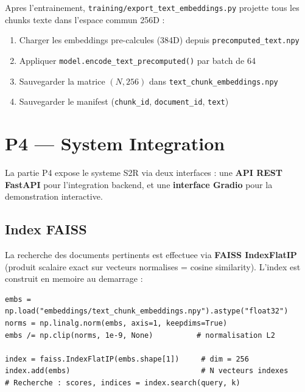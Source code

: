 \documentclass[12pt, a4paper]{article}
\begin{document}
Apres l'entrainement, \texttt{training/export\_text\_embeddings.py} projette
tous les chunks texte dans l'espace commun 256D :

\begin{enumerate}[leftmargin=1.5cm]
  \item Charger les embeddings pre-calcules (384D) depuis \texttt{precomputed\_text.npy}
  \item Appliquer \texttt{model.encode\_text\_precomputed()} par batch de 64
  \item Sauvegarder la matrice $(N, 256)$ dans \texttt{text\_chunk\_embeddings.npy}
  \item Sauvegarder le manifest (\texttt{chunk\_id}, \texttt{document\_id}, \texttt{text})
\end{enumerate}

\newpage

\section{P4 --- System Integration}

La partie P4 expose le systeme S2R via deux interfaces :
une \textbf{API REST FastAPI} pour l'integration backend,
et une \textbf{interface Gradio} pour la demonstration interactive.

\subsection{Index FAISS}

La recherche des documents pertinents est effectuee via
\textbf{FAISS IndexFlatIP} (produit scalaire exact sur vecteurs normalises = cosine similarity).
L'index est construit en memoire au demarrage :

\begin{lstlisting}[caption={Construction de l'index FAISS (api/main.py)}]
embs = np.load("embeddings/text_chunk_embeddings.npy").astype("float32")
norms = np.linalg.norm(embs, axis=1, keepdims=True)
embs /= np.clip(norms, 1e-9, None)          # normalisation L2

index = faiss.IndexFlatIP(embs.shape[1])     # dim = 256
index.add(embs)                              # N vecteurs indexes
# Recherche : scores, indices = index.search(query, k)
\end{lstlisting}
\end{document}
